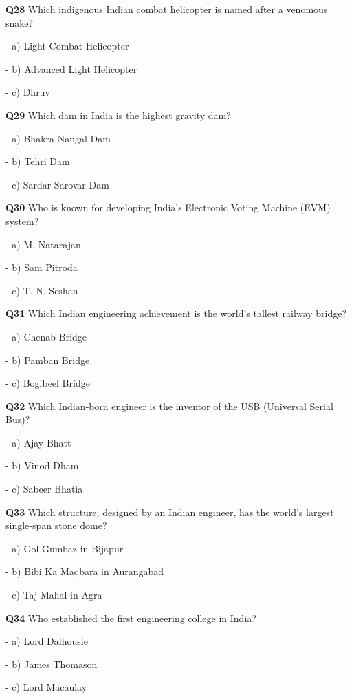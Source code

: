 \textbf{Q28} Which indigenous Indian combat helicopter is named after a venomous snake?\par
\quad - a) Light Combat Helicopter\par
\quad - b) Advanced Light Helicopter\par
\quad - c) Dhruv\par

\textbf{Q29} Which dam in India is the highest gravity dam?\par
\quad - a) Bhakra Nangal Dam\par
\quad - b) Tehri Dam\par
\quad - c) Sardar Sarovar Dam\par

\textbf{Q30} Who is known for developing India's Electronic Voting Machine (EVM) system?\par
\quad - a) M. Natarajan\par
\quad - b) Sam Pitroda\par
\quad - c) T. N. Seshan\par

\textbf{Q31} Which Indian engineering achievement is the world's tallest railway bridge?\par
\quad - a) Chenab Bridge\par
\quad - b) Pamban Bridge\par
\quad - c) Bogibeel Bridge\par

\textbf{Q32} Which Indian‑born engineer is the inventor of the USB (Universal Serial Bus)?\par
\quad - a) Ajay Bhatt\par
\quad - b) Vinod Dham\par
\quad - c) Sabeer Bhatia\par

\textbf{Q33} Which structure, designed by an Indian engineer, has the world's largest single‑span stone dome?\par
\quad - a) Gol Gumbaz in Bijapur\par
\quad - b) Bibi Ka Maqbara in Aurangabad\par
\quad - c) Taj Mahal in Agra\par

\textbf{Q34} Who established the first engineering college in India?\par
\quad - a) Lord Dalhousie\par
\quad - b) James Thomason\par
\quad - c) Lord Macaulay\par

